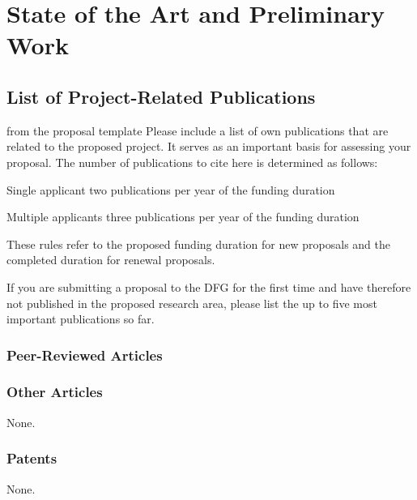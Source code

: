 \section{State of the Art and Preliminary Work }\label{stand}

\subsection{List of Project-Related Publications }

\begin{todo}{from the proposal template}
  Please include a list of own publications that are related to the proposed project. It
  serves as an important basis for assessing your proposal. The number of publications to
  cite here is determined as follows:
  \begin{compactdesc}
    \item[Single applicant] two publications per year of the funding duration
    \item[Multiple applicants] three publications per year of the funding duration
    \end{compactdesc}
    These rules refer to the proposed funding duration for new proposals and the completed
    duration for renewal proposals.
    
    If you are submitting a proposal to the DFG for the first time and have therefore not
    published in the proposed research area, please list the up to five most important
    publications so far.
\end{todo}

\subsubsection{Peer-Reviewed Articles }



\subsubsection{Other Articles } None.

\subsubsection{Patents } None.


